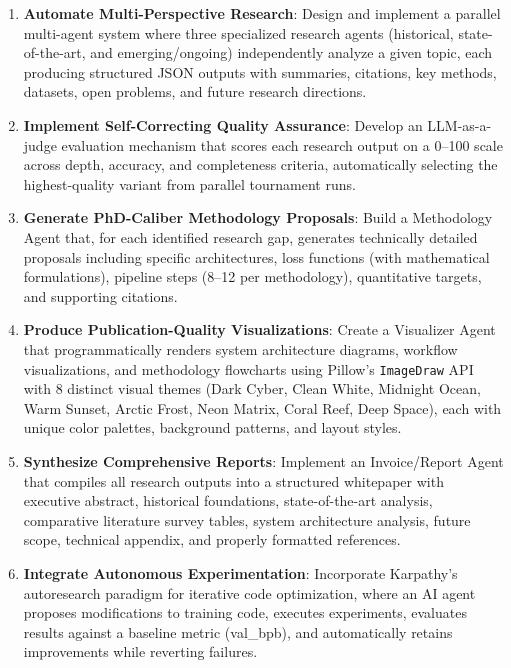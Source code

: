 \documentclass[a4paper,12pt,openany]{report}
\begin{document}
\begin{enumerate}[label=\arabic*., leftmargin=2cm]
\item \textbf{Automate Multi-Perspective Research}: Design and implement a parallel multi-agent system where three specialized research agents (historical, state-of-the-art, and emerging/ongoing) independently analyze a given topic, each producing structured JSON outputs with summaries, citations, key methods, datasets, open problems, and future research directions.

\item \textbf{Implement Self-Correcting Quality Assurance}: Develop an LLM-as-a-judge evaluation mechanism that scores each research output on a 0--100 scale across depth, accuracy, and completeness criteria, automatically selecting the highest-quality variant from parallel tournament runs.

\item \textbf{Generate PhD-Caliber Methodology Proposals}: Build a Methodology Agent that, for each identified research gap, generates technically detailed proposals including specific architectures, loss functions (with mathematical formulations), pipeline steps (8--12 per methodology), quantitative targets, and supporting citations.

\item \textbf{Produce Publication-Quality Visualizations}: Create a Visualizer Agent that programmatically renders system architecture diagrams, workflow visualizations, and methodology flowcharts using Pillow's \texttt{ImageDraw} API with 8 distinct visual themes (Dark Cyber, Clean White, Midnight Ocean, Warm Sunset, Arctic Frost, Neon Matrix, Coral Reef, Deep Space), each with unique color palettes, background patterns, and layout styles.

\item \textbf{Synthesize Comprehensive Reports}: Implement an Invoice/Report Agent that compiles all research outputs into a structured whitepaper with executive abstract, historical foundations, state-of-the-art analysis, comparative literature survey tables, system architecture analysis, future scope, technical appendix, and properly formatted references.

\item \textbf{Integrate Autonomous Experimentation}: Incorporate Karpathy's autoresearch paradigm for iterative code optimization, where an AI agent proposes modifications to training code, executes experiments, evaluates results against a baseline metric (val\_bpb), and automatically retains improvements while reverting failures.
\end{enumerate}
\end{document}
